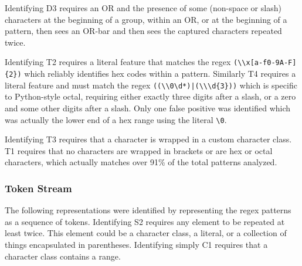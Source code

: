 Identifying D3 requires an OR and the presence of some (non-space or slash) characters at the beginning of a group, within an OR, or at the beginning of a pattern, then sees an OR-bar and then sees the captured characters repeated twice. 



Identifying T2 requires a literal feature that matches the regex \verb!(\\x[a-f0-9A-F]{2})! which reliably identifies hex codes within a pattern.  
Similarly T4 requires a literal feature and must match the regex \verb!((\\0\d*)|(\\\d{3}))! which is specific to Python-style octal, requiring either exactly three digits after a slash, or a zero and some other digits after a slash.  Only one false positive was identified which was actually the lower end of a hex range using the literal \verb!\0!.

Identifying T3 requires that a character is wrapped in a custom character class. 
 T1 requires that no characters are wrapped in brackets or are hex or octal characters, which actually matches over 91\% of the total patterns analyzed.

\subsubsection{Token Stream }
The following representations were identified by representing the regex patterns as a sequence of tokens. 
Identifying S2 requires any element to be repeated at least twice. This element could be a character class, a literal, or a collection of things encapsulated in parentheses. 
Identifying simply C1 requires that a character class contains a range. 


